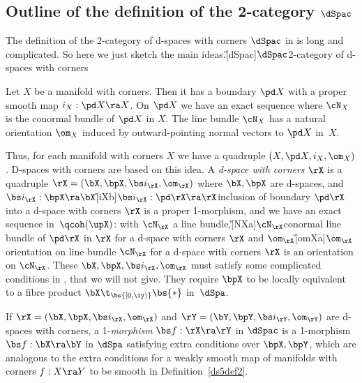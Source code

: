 \documentclass{article}
\begin{document}
\subsection{Outline of the definition of the 2-category $\dSpac$}
\label{ds61}

The definition of the 2-category of d-spaces with corners $\dSpac$
in \cite[\S 6.1]{Joyc6} is long and complicated. So here we just
sketch the main ideas.\G[dSpac]{$\dSpac$}{2-category of d-spaces
with corners}

Let $X$ be a manifold with corners. Then it has a boundary $\pd X$
with a proper smooth map $i_X:\pd X\ra X$. On $\pd X$ we have an
exact sequence
\e
{}
\label{ds6eq1}
\e
where $\cN_X$ is the conormal bundle of $\pd X$ in $X$. The line
bundle $\cN_X$ has a natural orientation $\om_X$ induced by
outward-pointing normal vectors to $\pd X$ in~$X$.

Thus, for each manifold with corners $X$ we have a quadruple $(X,\pd
X,i_X,\om_X)$. D-spaces with corners are based on this idea. A {\it
d-space with corners\/} $\rX$ is a quadruple $\rX=(\bX,\bpX,\bs
i_\rX,\om_\rX)$ where $\bX,\bpX$ are d-spaces, and $\bs
i_\rX:\bpX\ra\bX$\G[iXb]{$\bs i_\rX:\pd\rX\ra\rX$}{inclusion of
boundary $\pd\rX$ into a d-space with corners $\rX$} is a proper
1-morphism, and we have an exact sequence in~$\qcoh(\upX)$:
\e
{}
\label{ds6eq2}
\e
with $\cN_\rX$ a line bundle,\G[NXa]{$\cN_\rX$}{conormal line bundle
of $\pd\rX$ in $\rX$ for a d-space with corners $\rX$} and
$\om_\rX$\G[omXa]{$\om_\rX$}{orientation on line bundle $\cN_\rX$
for a d-space with corners $\rX$} is an orientation on $\cN_\rX$.
These $\bX,\bpX,\bs i_\rX,\om_\rX$ must satisfy some complicated
conditions in \cite[\S 6.1]{Joyc6}, that we will not give. They
require $\bpX$ to be locally equivalent to a fibre product
$\bX\t_{\bs{[0,\iy)}}\bs{*}$ in~$\dSpa$.

If $\rX=(\bX,\bpX,\bs i_\rX,\om_\rX)$ and $\rY=(\bY,\bpY,\bs
i_\rY,\om_\rY)$ are d-spaces with corners, a 1-{\it morphism\/} $\bs
f:\rX\ra\rY$ in $\dSpac$ is a 1-morphism $\bs f:\bX\ra\bY$ in
$\dSpa$ satisfying extra conditions over $\bpX,\bpY$, which are
analogous to the extra conditions for a weakly smooth map of
manifolds with corners $f:X\ra Y$ to be smooth in
Definition~\ref{ds5def2}.
\end{document}
